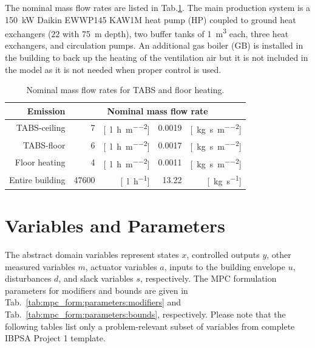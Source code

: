\documentclass[10pt]{article}
\begin{document}
The nominal mass flow rates are listed in Tab.\ref{hh:tab:mFloTabs}.
The main production system is a  \SI{150}{\kilo\watt} Daikin EWWP145 KAW1M  heat pump (HP) 
coupled to ground heat exchangers ($22$ with \SI{75}{\metre} depth), two buffer tanks of \SI{1}{\cubic\metre} each, 
three heat exchangers, and circulation pumps. 
An additional gas boiler  (GB) is installed in the 
building to back up the heating of the ventilation air but it is not included in the model
as it is not needed when proper control is used.
% 
\begin{table}[!htbp]
  \centering
  \caption{Nominal mass flow rates for TABS and floor heating.}
    \begin{tabular}{r|rr|rr}
    \toprule
    Emission & \multicolumn{4}{c}{Nominal mass flow rate} \\
    \midrule
    TABS-ceiling & 7     & [\SI{}{\litre\per\hour\per\metre\squared}] & 0.0019     & [\SI{}{\kg\per\second\per\metre\squared}] \\
    TABS-floor & 6     & [\SI{}{\litre\per\hour\per\metre\squared}] & 0.0017     & [\SI{}{\kg\per\second\per\metre\squared}] \\
    Floor heating & 4     & [\SI{}{\litre\per\hour\per\metre\squared}] & 0.0011     & [\SI{}{\kg\per\second\per\metre\squared}] 
    \\ \midrule
    Entire building & 47600     & [\SI{}{\litre\per\hour}] & 13.22     & [\SI{}{\kg\per\second}] 
    \\ \bottomrule
    \end{tabular}%
  \label{hh:tab:mFloTabs}%
\end{table}%





\section{Variables and Parameters}\label{sec:variables}
 The abstract domain variables represent states $x$, 
 controlled outputs $y$, other measured  variables $m$, 
  actuator variables $a$, inputs to the building envelope $u$,
 disturbances $d$,  and slack variables $s$, respectively. 
%  
The MPC formulation parameters for modifiers and bounds are given in Tab.~\ref{tab:mpc_form:parameters:modifiers} and Tab.~\ref{tab:mpc_form:parameters:bounds}, respectively.
Please note that the following tables list only a  problem-relevant subset of variables from complete IBPSA Project 1 template. 
\end{document}
